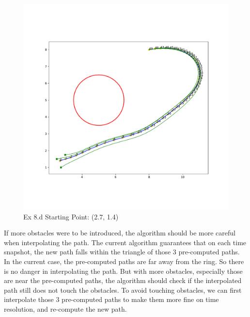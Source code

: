 \documentclass[
  course = {{16-811 Math Fundamentals for Robotics}},
  quartile = {{1}},
  assignment = 2,
  name = {{Kangle Deng}},
  email = {{kangled@andrew.cmu.edu}},
  firstexercise = 1
]{aga-homework}
\begin{document}
\begin{figure}
    \centering
    \includegraphics[width=\linewidth]{math/fig/hw2/ex8c3.pdf}
    \caption{Ex 8.d Starting Point: (2.7, 1.4)}
    \label{fig:ex8d3}
\end{figure}

\subexercise
If more obstacles were to be introduced, the algorithm should be more careful when interpolating the path. The current algorithm guarantees that on each time snapshot, the new path falls within the triangle of those 3 pre-computed paths. In the current case, the pre-computed paths are far away from the ring. So there is no danger in interpolating the path. But with more obstacles, especially those are near the pre-computed paths, the algorithm should check if the interpolated path still does not touch the obstacles. To avoid touching obstacles, we can first interpolate those 3 pre-computed paths to make them more fine on time resolution, and re-compute the new path.
\end{document}
